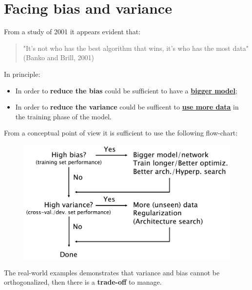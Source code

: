 \section{Facing bias and variance}
From a study of 2001 it appears evident that:
\begin{quotation}
    "It's not who has the best algorithm that wins, it's who has the most data" (Banko and Brill, 2001)
\end{quotation}
In principle:
\begin{itemize}
    \itemsep-0.2em
    \item In order to \textbf{reduce the bias} could be sufficient to have a \underline{\textbf{bigger model}}; 
    \item In order to \textbf{reduce the variance} could be sufficent to \underline{\textbf{use more data}} in the training phase of the model.
\end{itemize}
From a conceptual point of view it is sufficient to use the following flow-chart:

\begin{figure}[h]
    \centering
    \includegraphics[scale=0.5]{img/flowchart.png}
\end{figure}
\noindent
The real-world examples demonstrates that variance and bias cannot be orthogonalized, then there is a \textbf{trade-off} to manage.

